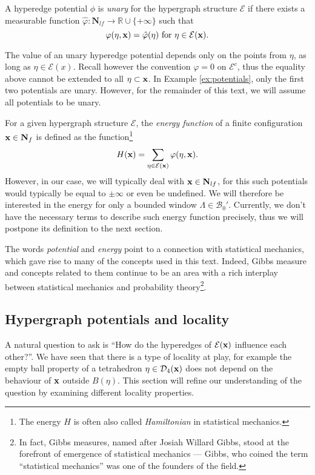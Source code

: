 \begin{definition}
	A hyperedge potential $\phi$ is \textit{unary} for the hypergraph structure $\mathcal E$ if there exists a measurable function $\hat\varphi:\mathbf N_{lf} \to \mathbb R \cup \{+\infty\}$ such that
	$$\varphi(\eta,{\mathbf{x}}) = \hat\varphi(\eta) \text{ for } \eta \in \mathcal E({\mathbf{x}}).$$
\end{definition}
The value of an unary hyperedge potential depends only on the points from $\eta$, as long as $\eta \in \mathcal E(x)$.  Recall however the convention $\varphi=0$ on $\mathcal E^c$, thus the equality above cannot be extended to all $\eta\subset {\mathbf{x}}$. 
In Example \ref{ex:potentials}, only the first two potentials are unary. However, for the remainder of this text, we will assume all potentials to be unary.\newline


For a given hypergraph structure $\mathcal E$, the \textit{energy function} of a finite configuration ${\mathbf{x}}\in \mathbf N_{f}$ is defined as the function\footnote{The energy $H$ is often also called \textit{Hamiltonian} in statistical mechanics.}
$$H({\mathbf{x}}) = \sum_{\eta \in \mathcal E({\mathbf{x}})} \varphi(\eta,{\mathbf{x}}).$$
However, in our case, we will typically deal with ${\mathbf{x}}\in \mathbf N_{lf}$, for this such potentials would typically be equal to $\pm \infty$ or even be undefined. We will therefore be interested in the energy for only a bounded window $\Lambda \in \mathcal B_0'$. Currently, we don't have the necessary terms to describe such energy function precisely, thus we will postpone its definition to the next section. 

The words \textit{potential} and \textit{energy} point to a connection with statistical mechanics, which gave rise to many of the concepts used in this text. Indeed, Gibbs measure and concepts related to them continue to be an area with a rich interplay between statistical mechanics and probability theory\footnote{In fact, Gibbs measures, named after Josiah Willard Gibbs, stood at the forefront of emergence of statistical mechanics --- Gibbs, who coined the term ``statistical mechanics'' was one of the founders of the field.}.




\subsection{Hypergraph potentials and locality}
A natural question to ask is ``How do the hyperedges of $\mathcal E({\mathbf{x}})$ influence each other?''. We have seen that there is a type of locality at play, for example  the empty ball property of a tetrahedron $\eta\in\mathcal D_4({\mathbf{x}})$ does not depend on the behaviour of ${\mathbf{x}}$ outside $B(\eta)$. This section will refine our understanding of the question by examining different locality properties.

